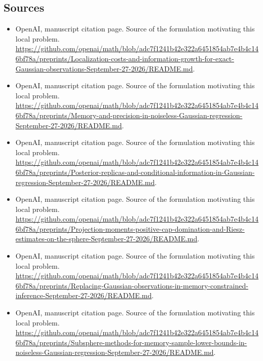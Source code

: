 \documentclass[11pt]{article}
\begin{document}
\subsection{Sources}
\begin{itemize}
\item[S1] OpenAI, manuscript citation page. Source of the formulation motivating this local problem.
\url{https://github.com/openai/math/blob/adc7f1241b42e322a6451854ab7e4b4c146bf78a/preprints/Localization-costs-and-information-growth-for-exact-Gaussian-observations-September-27-2026/README.md}.
\item[S2] OpenAI, manuscript citation page. Source of the formulation motivating this local problem.
\url{https://github.com/openai/math/blob/adc7f1241b42e322a6451854ab7e4b4c146bf78a/preprints/Memory-and-precision-in-noiseless-Gaussian-regression-September-27-2026/README.md}.
\item[S3] OpenAI, manuscript citation page. Source of the formulation motivating this local problem.
\url{https://github.com/openai/math/blob/adc7f1241b42e322a6451854ab7e4b4c146bf78a/preprints/Posterior-replicas-and-conditional-information-in-Gaussian-regression-September-27-2026/README.md}.
\item[S4] OpenAI, manuscript citation page. Source of the formulation motivating this local problem.
\url{https://github.com/openai/math/blob/adc7f1241b42e322a6451854ab7e4b4c146bf78a/preprints/Projection-moments-positive-cap-domination-and-Riesz-estimates-on-the-sphere-September-27-2026/README.md}.
\item[S5] OpenAI, manuscript citation page. Source of the formulation motivating this local problem.
\url{https://github.com/openai/math/blob/adc7f1241b42e322a6451854ab7e4b4c146bf78a/preprints/Replacing-Gaussian-observations-in-memory-constrained-inference-September-27-2026/README.md}.
\item[S6] OpenAI, manuscript citation page. Source of the formulation motivating this local problem.
\url{https://github.com/openai/math/blob/adc7f1241b42e322a6451854ab7e4b4c146bf78a/preprints/Subsphere-methods-for-memory-sample-lower-bounds-in-noiseless-Gaussian-regression-September-27-2026/README.md}.
\end{itemize}
\end{document}
